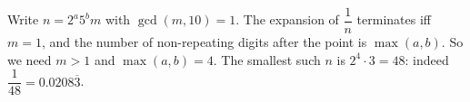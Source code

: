 Write $n=2^a5^bm$ with $\gcd(m,10)=1$. The expansion of $\dfrac{1}{n}$ terminates iff $m=1$, and the number of non-repeating digits after the point is $\max(a,b)$. So we need $m>1$ and $\max(a,b)=4$. The smallest such $n$ is $2^4\cdot3=\boxed{48}$: indeed $\dfrac{1}{48}=0.0208\overline{3}$.
